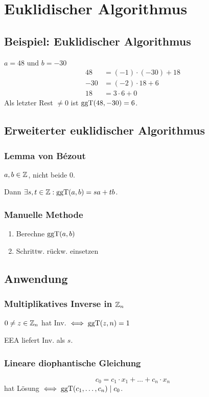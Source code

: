 \section*{Euklidischer Algorithmus}

\subsection*{Beispiel: Euklidischer Algorithmus}
$a=48$ und $b=-30$
\begin{align*}
	48 &= (-1) \cdot (-30) + 18 \\
	-30 &= (-2) \cdot 18 + 6 \\
	18 &= 3 \cdot 6 + 0
\end{align*}
Als letzter Rest $\neq 0$ ist $\operatorname{ggT}(48,-30) = 6$.

\subsection*{Erweiterter euklidischer Algorithmus}

\subsubsection*{Lemma von B\'ezout}
$a,b\in\mathbb{Z}$, nicht beide 0.

Dann $\exists s,t\in\mathbb{Z}: \operatorname{ggT}(a,b)=sa + tb$.

\subsubsection*{Manuelle Methode}
\begin{enumerate}
	\item Berechne $\operatorname{ggT}(a,b)$
	\item Schrittw. rückw. einsetzen
\end{enumerate}

\subsection*{Anwendung}

\subsubsection*{Multiplikatives Inverse in $\mathbb{Z}_n$}
$0\neq z \in \mathbb{Z}_n$ hat Inv. $\iff \operatorname{ggT}(z,n)=1$

EEA liefert Inv. als $s$.

\subsubsection*{Lineare diophantische Gleichung}
\[c_0 = c_1\cdot x_1 + \ldots + c_n \cdot x_n\]
hat Lösung $\iff \operatorname{ggT}(c_1,\ldots,c_n) \mid c_0$.
